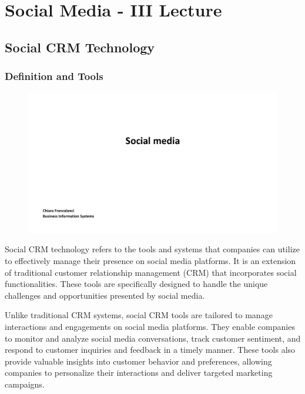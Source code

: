 \section{Social Media - III Lecture}

\subsection{Social CRM Technology}\label{social-crm-technology}

\subsubsection{Definition and Tools}\label{definition-and-tools}

\begin{figure}[!h]
    \centering
    \includegraphics[page=24, trim = 1.5cm 5cm 1.5cm 4cm, clip, width=\textwidth]{images/04 - Social_Media.pdf}
\end{figure}

Social CRM technology refers to the tools and systems that companies can
utilize to effectively manage their presence on social media platforms.
It is an extension of traditional customer relationship management (CRM)
that incorporates social functionalities. These tools are specifically
designed to handle the unique challenges and opportunities presented by
social media.

Unlike traditional CRM systems, social CRM tools are tailored to manage
interactions and engagements on social media platforms. They enable
companies to monitor and analyze social media conversations, track
customer sentiment, and respond to customer inquiries and feedback in a
timely manner. These tools also provide valuable insights into customer
behavior and preferences, allowing companies to personalize their
interactions and deliver targeted marketing campaigns.

